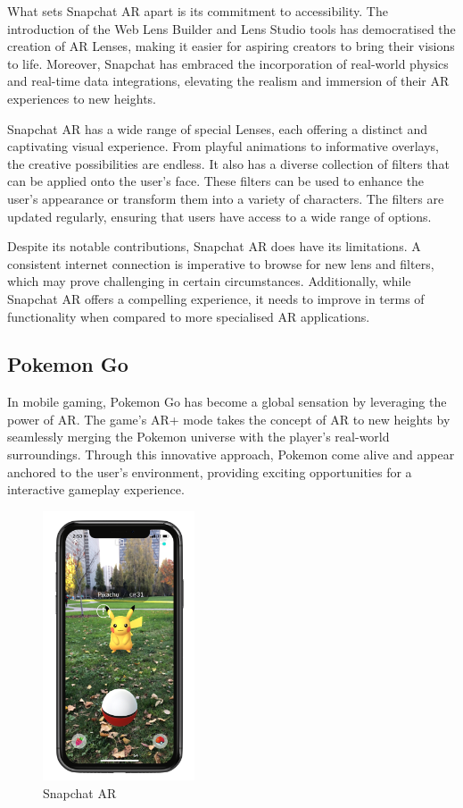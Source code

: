 What sets Snapchat \ac{AR} apart is its commitment to accessibility. The introduction of the Web Lens Builder and Lens Studio tools has democratised the creation of \ac{AR} Lenses, making it easier for aspiring creators to bring their visions to life. Moreover, Snapchat has embraced the incorporation of real-world physics and real-time data integrations, elevating the realism and immersion of their \ac{AR} experiences to new heights.

Snapchat \ac{AR} has a wide range of special Lenses, each offering a distinct and captivating visual experience. From playful animations to informative overlays, the creative possibilities are endless. It also has a diverse collection of filters that can be applied onto the user's face. These filters can be used to enhance the user's appearance or transform them into a variety of characters. The filters are updated regularly, ensuring that users have access to a wide range of options.

Despite its notable contributions, Snapchat \ac{AR} does have its limitations. A consistent internet connection is imperative to browse for new lens and filters, which may prove challenging in certain circumstances. Additionally, while Snapchat \ac{AR} offers a compelling experience, it needs to improve in terms of functionality when compared to more specialised \ac{AR} applications.



\subsection*{Pokemon Go}
In mobile gaming, Pokemon Go has become a global sensation by leveraging the power of \ac{AR}. The game's \ac{AR}+\cite{AR+} mode takes the concept of \ac{AR} to new heights by seamlessly merging the Pokemon universe with the player's real-world surroundings. Through this innovative approach, Pokemon come alive and appear anchored to the user's environment, providing exciting opportunities for a interactive gameplay experience.


\begin{figure}
    \centering
    \includegraphics[width=0.4\textwidth]{img/related-apps/PokemonGO.png}
    \caption{Snapchat AR}
    \label{fig:snapchat}
\end{figure}

